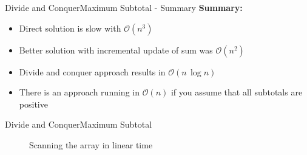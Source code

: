 
\begin{frame}{Divide and Conquer}{Maximum Subtotal - Summary}
  \textbf{Summary:}
  \begin{itemize}
    \item
      Direct solution is slow with {\color{Mittel-Blau}$\mathcal{O}(n^3)$}
    \item
      Better solution with incremental update of sum was
      {\color{Mittel-Blau}$\mathcal{O}(n^2)$}
    \item
      Divide and conquer approach results in
      {\color{Mittel-Blau}$\mathcal{O}(n\,\log n)$}
    \item
      There is an approach running in {\color{Mittel-Blau}$\mathcal{O}(n)$}
      if you assume that all subtotals are positive
  \end{itemize}
\end{frame}





\begin{frame}{Divide and Conquer}{Maximum Subtotal}
  \begin{figure}
    \begin{adjustbox}{width=\linewidth}
      
    \end{adjustbox}
    \caption{Scanning the array in linear time}
    \label{fig:divide_and_conquer:max_sub_total_linear}
  \end{figure}
\end{frame}

